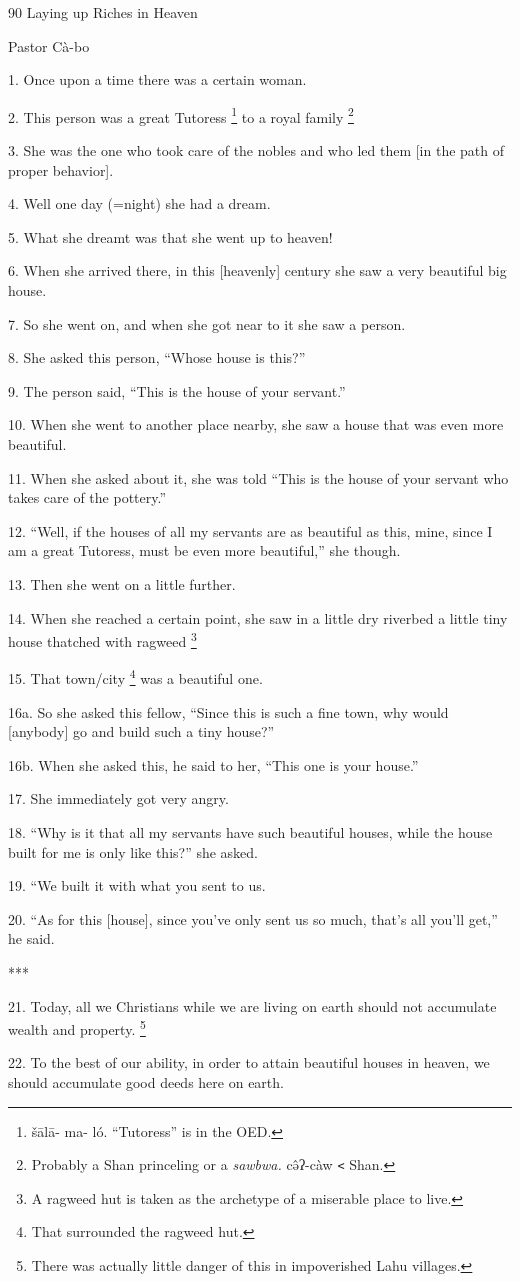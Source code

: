 
90 Laying up Riches in Heaven

Pastor Cà-bo

1. Once upon a time there was a certain woman.

2. This person was a great Tutoress \footnote{šālā-     ma-   ló. ``Tutoress'' is in the OED.} to a royal family \.\footnote{Probably a Shan princeling or a \textit{sawbwa. }cə̂ʔ-càw \texttt{<} Shan.}

3. She was the one who took care of the nobles and who led them [in the path of
proper behavior].

4. Well one day (=night) she had a dream.

5. What she dreamt was that she went up to heaven!

6. When she arrived there, in this [heavenly] century she saw a very beautiful
big house.

7. So she went on, and when she got near to it she saw a person.

8. She asked this person, ``Whose house is this?''

9. The person said, ``This is the house of your servant.''

10. When she went to another place nearby, she saw a house that was even more beautiful.

11. When she asked about it, she was told ``This is the house of your servant who
takes care of the pottery.''

12. ``Well, if the houses of all my servants are as beautiful as this, mine, since
I am a great Tutoress, must be even more beautiful,'' she though.

13. Then she went on a little further.

14. When she reached a certain point, she saw in a little dry riverbed a little
tiny house thatched with ragweed \.\footnote{A ragweed hut is taken as the archetype of a miserable place to live.}

15. That town/city \footnote{That surrounded the ragweed hut.} was a beautiful one.

16a. So she asked this fellow, ``Since this is such a fine town, why would [anybody]
go and build such a tiny house?''

16b. When she asked this, he said to her, ``This one is your house.''

17. She immediately got very angry.

18. ``Why is it that all my servants have such beautiful houses, while the house
built for me is only like this?'' she asked.

19. ``We built it with what you sent to us.

20. ``As for this [house], since you've only sent us so much, that's all you'll
get,'' he said.

***

21. Today, all we Christians while we are living on earth should not accumulate
wealth and property. \footnote{There was actually little danger of this in impoverished Lahu villages.}

22. To the best of our ability, in order to attain beautiful houses in heaven,
we should accumulate good deeds here on earth.

